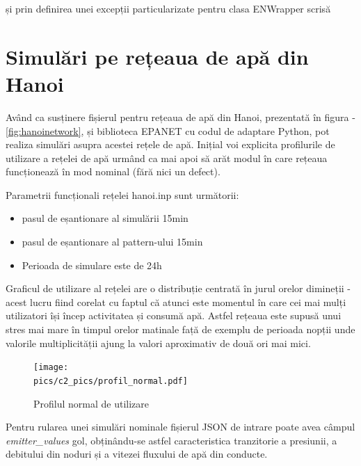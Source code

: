 

și prin definirea unei excepții particularizate pentru clasa ENWrapper scrisă



\section{Simulări pe rețeaua de apă din Hanoi}

Având ca susținere fișierul pentru rețeaua de apă din Hanoi, prezentată în figura - \ref{fig:hanoinetwork},  și biblioteca EPANET cu codul de
adaptare Python, pot realiza simulări asupra acestei rețele de apă. Inițial voi explicita profilurile de utilizare a
rețelei de apă urmând ca mai apoi să arăt modul în care rețeaua funcționează în mod nominal (fără nici un defect).

Parametrii funcționali rețelei hanoi.inp sunt următorii:

\begin{itemize}
    \item pasul de eșantionare al simulării 15min
    \item pasul de eșantionare al pattern-ului 15min
    \item Perioada de simulare este de 24h
\end{itemize}

Graficul de utilizare al rețelei are o distribuție centrată în jurul orelor dimineții - acest lucru fiind corelat cu faptul că atunci este momentul în care cei mai mulți utilizatori își încep activitatea și consumă apă. Astfel rețeaua este supusă unui stres mai mare în timpul orelor matinale față de exemplu de perioada nopții unde valorile multiplicității ajung la valori aproximativ de două ori mai mici.

\begin{figure}[H]
  \centering
  \texttt{[image: \\pics/c2\_pics/profil\_normal.pdf]}
  \caption{Profilul normal de utilizare}
  \label{fig:normalprofile}
\end{figure}

Pentru rularea unei simulări nominale fișierul JSON de intrare poate avea câmpul  \emph{emitter\_values} gol, obținându-se astfel caracteristica tranzitorie a presiunii, a debitului din noduri și a vitezei fluxului de apă din conducte.



